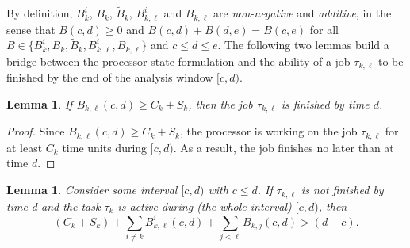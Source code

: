 \documentclass[conference]{IEEEtran}
\newtheorem{lem}[thm]{Lemma}
\theoremstyle{definition}
\theoremstyle{remark}
\begin{document}
	By definition, $B_k^i$, $B_k$, $\widetilde{B}_k$, $B_{k,\ell}^i$ and $B_{k,\ell}$ are \emph{non-negative} and \emph{additive}, in the sense that $B(c,d)\geq 0$ and $B(c, d) + B(d,e) = B(c,e)$ for all $B \in \{B_k^i, B_{k}, \widetilde{B}_k, B_{k,\ell}^i, B_{k, \ell}\}$ and $c\leq d \leq e$.
	The following two lemmas build a bridge between the processor state formulation and the ability of a job $\tau_{k,\ell}$ to be finished by the end of the analysis window $[c,d)$.
	
	\begin{lem}\label{lem:Bkl_finished}
		If $B_{k,\ell}(c,d) \geq C_k + S_k$, then the job $\tau_{k,\ell}$ is finished by time $d$.
	\end{lem}
	\begin{proof}
		Since $B_{k,\ell}(c,d) \geq C_k + S_k$, the processor is working on the job $\tau_{k,\ell}$ for at least $C_k$ time units during $[c,d)$.
		As a result, the job finishes no later than at time $d$.
	\end{proof}
	
	\begin{lem}\label{lem:non-sched}
		Consider some interval $[c,d)$ with $c\leq d$.
		If $\tau_{k,\ell}$ is not finished by time d and the task $\tau_k$ is active during (the whole interval) $[c,d)$, then 
		\begin{equation}
			(C_k+S_k) + \sum_{i \neq k} B^i_{k,\ell}(c,d) + \sum_{j < \ell} B_{k,j}(c,d) > (d-c).
		\end{equation}
	\end{lem}
\end{document}
